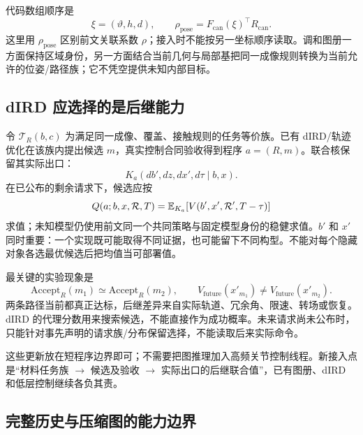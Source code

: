 \documentclass[11pt,a4paper,fontset=fandol]{ctexart}
\theoremstyle{definition}
\theoremstyle{remark}\newtheorem{remark}[theorem]{说明}
\numberwithin{equation}{section}
\begin{document}
代码数组顺序是
\begin{equation}
 \xi=(\vartheta,h,d),\qquad
 \rho_{\mathrm{pose}}=F_{\mathrm{can}}(\xi)^\top R_{\mathrm{can}}.
\end{equation}
这里用 $\rho_{\mathrm{pose}}$ 区别前文关联系数 $\rho$；接入时不能按另一坐标顺序读取。调和图册一方面保持区域身份，另一方面结合当前几何与局部基把同一成像规则转换为当前允许的位姿/路径族；它不凭空提供未知内部目标。

\subsection{dIRD 应选择的是后继能力}
令 $\mathcal T_R(b,c)$ 为满足同一成像、覆盖、接触规则的任务等价族。已有 dIRD/轨迹优化在该族内提出候选 $m$，真实控制合同验收得到程序 $a=(R,m)$。联合核保留其实际出口：
\begin{equation}
 K_a(db',dz,dx',d\tau\mid b,x).
\end{equation}
在已公布的剩余请求下，候选应按
\begin{equation}
 Q(a;b,x,\mathcal R,T)
 =\mathbb E_{K_a}\!\left[
 V(b',x',\mathcal R',T-\tau)\right]
 \label{eq:successor_graph}
\end{equation}
求值；未知模型仍使用前文同一个共同策略与固定模型身份的稳健求值。$b'$ 和 $x'$ 同时重要：一个实现既可能取得不同证据，也可能留下不同构型。不能对每个隐藏对象各选最优候选后把均值当可部署值。

最关键的实验现象是
\begin{equation}
 \mathrm{Accept}_{R}(m_1)\simeq\mathrm{Accept}_{R}(m_2),
 \qquad
 V_{\mathrm{future}}(x'_{m_1})
 \ne V_{\mathrm{future}}(x'_{m_2}).
\end{equation}
两条路径当前都真正达标，后继差异来自实际轨道、冗余角、限速、转场或恢复。dIRD 的代理分数用来搜索候选，不能直接作为成功概率。未来请求尚未公布时，只能针对事先声明的请求族/分布保留选择，不能读取后来实际命令。

这些更新放在短程序边界即可；不需要把图推理加入高频关节控制线程。新接入点是“材料任务族 $\to$ 候选及验收 $\to$ 实际出口的后继联合值”，已有图册、dIRD 和低层控制继续各负其责。

\subsection{完整历史与压缩图的能力边界}
\end{document}
